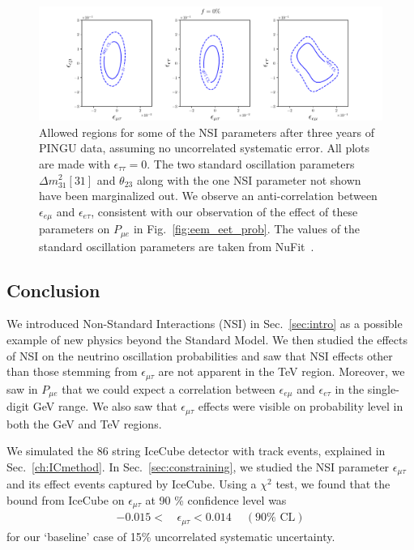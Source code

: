 \documentclass{revtex4-2}
\newcommand{\emt}{\ensuremath{\epsilon_{\mu\tau}}}
\newcommand{\eet}{\epsilon_{e\tau}}
\newcommand{\eem}{\epsilon_{e\mu}}
\newcommand{\ett}{\ensuremath{\epsilon_{\tau\tau}}}
\newcommand{\dm}{\Delta m^2_{31}}
\newcommand{\Pme}{P_{\mu  e}}
\begin{document}
{{ \begin{figure}
    \centering
    \includegraphics[width=\textwidth]{figures/PINGU_2D_all_f0.pdf}
    \caption{Allowed regions for some of the NSI parameters after three years of PINGU data, assuming no uncorrelated systematic error. All plots are made with $\ett = 0$. The two
    standard oscillation parameters $\dm[31]$ and $\theta_{23}$ along with the one NSI parameter not shown have been marginalized out. We observe an anti-correlation between $\eem$ and $\eet$,
    consistent with our observation of the effect of these parameters on $\Pme$ in Fig.~\ref{fig:eem_eet_prob}.
    The values of the standard oscillation parameters 
    are taken from NuFit~\cite{nufit}.}\label{fig:PINGU_2D}
 \end{figure}

\subsection{Conclusion}\label{sec:conclusion}
We introduced Non-Standard Interactions (NSI) in Sec.~\ref{sec:intro} as a possible example of new physics beyond the Standard Model.
We then studied the effects of NSI on the neutrino oscillation probabilities and saw that NSI effects other than those stemming from $\emt$ are not apparent in the \si{\TeV} region.
Moreover, we saw in $\Pme$ that we could expect a correlation between $\eem$ and $\eet$ in the single-digit \si{\GeV} range.
We also saw that $\emt$ effects were visible on probability level in both the \si{\GeV} and \si{\TeV} regions.

We simulated the 86 string IceCube detector with track events, explained in Sec.~\ref{ch:ICmethod}.
In Sec.~\ref{sec:constraining}, we studied the NSI parameter $\emt$ and its effect events captured by IceCube. 
Using a $\chi^2$ test, we found that the bound from IceCube on $\emt$ at 90 \% confidence level was 
\begin{align}
    -0.015 <\,& \emt < 0.014\ \quad (90\% \text{ CL})
\end{align}
for our `baseline' case of 15\% uncorrelated systematic uncertainty.

}}
\end{document}
